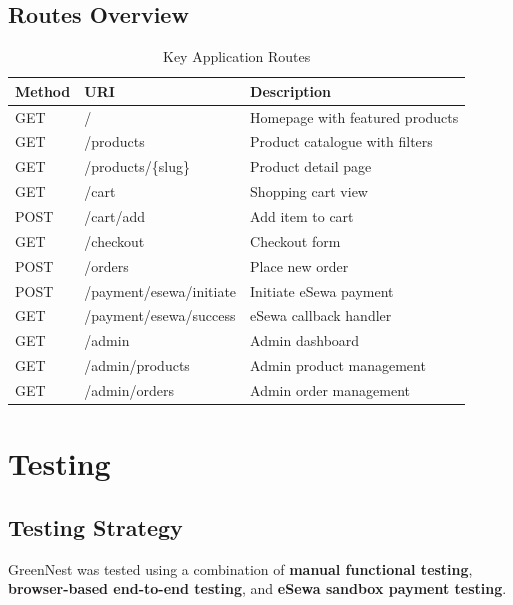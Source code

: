 \documentclass[12pt,a4paper]{report}
\begin{document}
\section{Routes Overview}

\begin{table}[H]
\centering
\caption{Key Application Routes}
\begin{tabular}{@{}lll@{}}
\toprule
\textbf{Method} & \textbf{URI} & \textbf{Description} \\
\midrule
GET  & /                     & Homepage with featured products \\
GET  & /products             & Product catalogue with filters \\
GET  & /products/\{slug\}    & Product detail page \\
GET  & /cart                 & Shopping cart view \\
POST & /cart/add             & Add item to cart \\
GET  & /checkout             & Checkout form \\
POST & /orders               & Place new order \\
POST & /payment/esewa/initiate & Initiate eSewa payment \\
GET  & /payment/esewa/success  & eSewa callback handler \\
GET  & /admin                & Admin dashboard \\
GET  & /admin/products       & Admin product management \\
GET  & /admin/orders         & Admin order management \\
\bottomrule
\end{tabular}
\end{table}

\chapter{Testing}

\section{Testing Strategy}

GreenNest was tested using a combination of \textbf{manual functional testing}, \textbf{browser-based end-to-end testing}, and \textbf{eSewa sandbox payment testing}.
\end{document}

